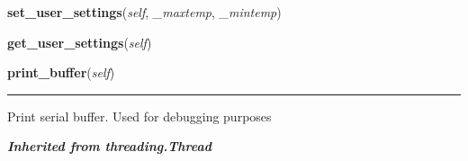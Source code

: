     \label{sensor_thread:Sensor:set_user_settings}

    \vspace{0.5ex}

\hspace{.8\funcindent}\begin{boxedminipage}{\funcwidth}

    \raggedright \textbf{set\_user\_settings}(\textit{self}, \textit{\_maxtemp}, \textit{\_mintemp})

\setlength{\parskip}{2ex}
\setlength{\parskip}{1ex}
    \end{boxedminipage}

    \label{sensor_thread:Sensor:get_user_settings}

    \vspace{0.5ex}

\hspace{.8\funcindent}\begin{boxedminipage}{\funcwidth}

    \raggedright \textbf{get\_user\_settings}(\textit{self})

\setlength{\parskip}{2ex}
\setlength{\parskip}{1ex}
    \end{boxedminipage}

    \label{sensor_thread:Sensor:print_buffer}

    \vspace{0.5ex}

\hspace{.8\funcindent}\begin{boxedminipage}{\funcwidth}

    \raggedright \textbf{print\_buffer}(\textit{self})

    \vspace{-1.5ex}

    \rule{\textwidth}{0.5\fboxrule}
\setlength{\parskip}{2ex}
    Print serial buffer. Used for debugging purposes

\setlength{\parskip}{1ex}
    \end{boxedminipage}


\large{\textbf{\textit{Inherited from threading.Thread}}}

